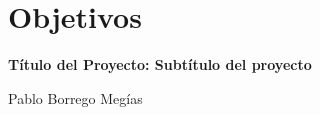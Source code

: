 \chapter{Objetivos}

\begin{center}
    {\large\bfseries Título del Proyecto: Subtítulo del proyecto}\\
    \end{center}
    \begin{center}
    Pablo Borrego Megías \\
    \end{center}